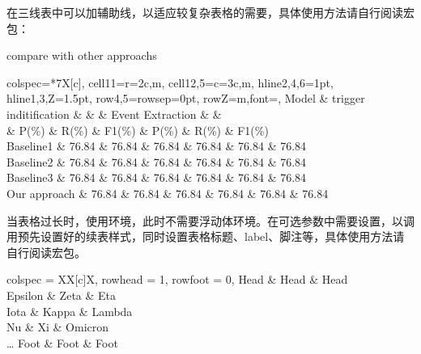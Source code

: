 
在三线表中可以加辅助线，以适应较复杂表格的需要，具体使用方法请自行阅读宏包：

\begin{texcode}[]{}
\begin{table}[H]
  \centering
  \caption{compare with other approachs}
  \label{table:methodcompare}
  \begin{tblr}{
      colspec={*{7}{X[c]}},
      cell{1}{1}={r=2}{c,m},
      cell{1}{2,5}={c=3}{c,m},
      hline{2,4,6}={1pt},
      hline{1,3,Z}={1.5pt},
      row{4,5}={rowsep=0pt},
      row{Z}={m,font=\bfseries},
  }
    Model & trigger inditification & & & Event Extraction & & \\
    & P(\%) & R(\%) & F1(\%) & P(\%) & R(\%) & F1(\%) \\
    Baseline1 & 76.84 & 76.84 & 76.84 & 76.84 & 76.84 & 76.84 \\
    Baseline2  & 76.84 & 76.84 & 76.84 & 76.84 & 76.84 & 76.84 \\
    Baseline3  & 76.84 & 76.84 & 76.84 & 76.84 & 76.84 & 76.84 \\
    Our approach  & 76.84 & 76.84 & 76.84 & 76.84 & 76.84 & 76.84 \\
  \end{tblr}
\end{table}
\end{texcode}


当表格过长时，使用环境，此时不需要浮动体环境。在可选参数中需要设置，以调用预先设置好的续表样式，同时设置表格标题、label、脚注等，具体使用方法请自行阅读宏包。

\begin{texcodeonly}[]{}
    \begin{longtblr}[
        theme = xjtu_std,
        caption = {A Long Long Long Long Long Long Long Table },
        entry = {Short Caption},
        label = {tblr:test},
        note{a} = {脚注},
        note{$\dag$} = {还是脚注},
        remark{Note} = {注释，即表格内没有标注符号的脚注},
        remark{Source} = {还是注释},
    ]{
        colspec = {XX[c]X},
        rowhead = 1, rowfoot = 0,
    }
    \toprule
    Head & Head & Head \\
    \midrule
    Epsilon & Zeta & Eta \\
    Iota & Kappa\TblrNote{$\dag$} & Lambda \\
    Nu & Xi & Omicron \\
    \dots 
    Foot & Foot & Foot \\
    \bottomrule
    \end{longtblr}
\end{texcodeonly}

